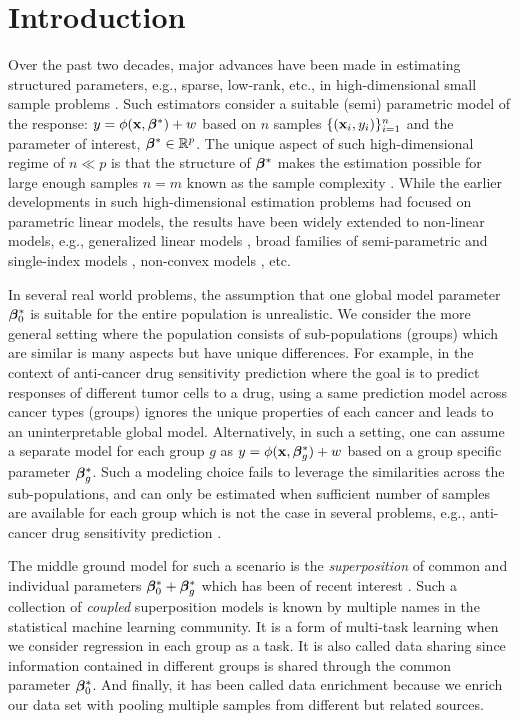 \section{Introduction}
Over the past two decades, major advances have been made in estimating structured parameters, e.g., sparse, low-rank, etc., in high-dimensional small sample problems \cite{candes2010power, donoho2006compressed, friedman2008sparse}. Such estimators consider a suitable (semi) parametric model of the response: $y = \phi(\mathbf{x},\boldsymbol{\beta}^*) + w$ based on $n$ samples $\{(\mathbf{x}_i,y_i)\}_{i=1}^n$ and the parameter of interest, $\boldsymbol{\beta}^* \in \mathbb R^p$. The unique aspect of such high-dimensional regime of $n \ll p$ is that the structure of $\boldsymbol{\beta}^*$ makes
the estimation possible for large enough samples $n = m$ known as the sample complexity \cite{candes2009exact, candes2006robust, tibshirani1996regression}. While the earlier developments in such high-dimensional estimation problems had focused on parametric linear models, the results have been widely extended to non-linear models, e.g., generalized linear models \cite{bach2012optimization, negahban2009unified}, broad families of semi-parametric and single-index models \cite{boufounos20081, plan2017high}, non-convex models \cite{blumensath2009iterative,jain2013low}, etc.

In several real world problems, the assumption that one global model parameter $\boldsymbol{\beta}_0^*$ is suitable for the entire population is unrealistic.
We consider the more general setting where the population consists of sub-populations (groups) which are similar is many aspects but have unique differences. For example, in the context of anti-cancer drug sensitivity prediction where the goal is to predict responses of different tumor cells to a drug, using a same prediction model across cancer types (groups) ignores the unique properties of each cancer and leads to an uninterpretable global model. Alternatively, in such a setting, one can assume a separate model for each group $g$ as $y = \phi(\mathbf{x}, \boldsymbol{\beta}_g^*) + w$ based on a group specific parameter $\boldsymbol{\beta}^*_g$. Such a modeling choice fails to leverage the similarities across the sub-populations, and can only be estimated when sufficient number of samples are available for each group which is not the case in several problems, e.g., anti-cancer drug sensitivity prediction \cite{barretina2012cancer, iorio2016landscape1}.

The middle ground model for such a scenario is the \emph{superposition} of common and individual parameters $\boldsymbol{\beta}_0^* + \boldsymbol{\beta}_g^*$ which has been of recent interest \cite{guba16, mctr13, Yang2013-pf}. Such a collection of \emph{coupled} superposition models is known by multiple names in the statistical machine learning community. It is a form of multi-task learning \cite{jrsr10, Zhang2017-rm} when we consider regression in each group as a task. It is also called data sharing \cite{grti16} since information contained in different groups is shared through the common parameter $\boldsymbol{\beta}_0^*$. And finally, it has been called data enrichment \cite{Chen2015-fj} because we enrich our data set with pooling multiple samples from different but related sources. 

